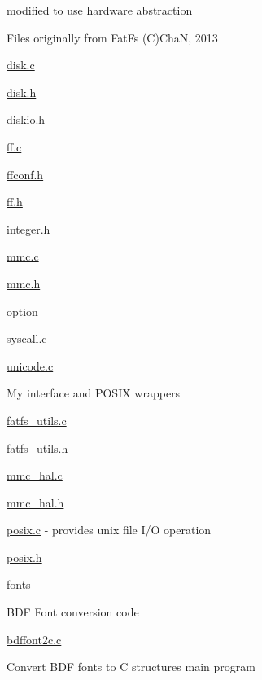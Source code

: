 \begin{DoxyItemize}
\begin{DoxyItemize}
\begin{DoxyItemize}
\item modified to use hardware abstraction
\end{DoxyItemize}
\item Files originally from Fat\+Fs (C)ChaN, 2013
\begin{DoxyItemize}
\item \hyperlink{disk_8c}{disk.\+c}
\item \hyperlink{disk_8h}{disk.\+h}
\item \hyperlink{diskio_8h}{diskio.\+h}
\item \hyperlink{ff_8c}{ff.\+c}
\item \hyperlink{ffconf_8h}{ffconf.\+h}
\item \hyperlink{ff_8h}{ff.\+h}
\item \hyperlink{integer_8h}{integer.\+h}
\item \hyperlink{mmc_8c}{mmc.\+c}
\item \hyperlink{mmc_8h}{mmc.\+h}
\item option
\item \hyperlink{syscall_8c}{syscall.\+c}
\item \hyperlink{unicode_8c}{unicode.\+c}
\end{DoxyItemize}
\item My interface and P\+O\+S\+IX wrappers
\begin{DoxyItemize}
\item \hyperlink{fatfs__utils_8c}{fatfs\+\_\+utils.\+c}
\item \hyperlink{fatfs__utils_8h}{fatfs\+\_\+utils.\+h}
\item \hyperlink{mmc__hal_8c}{mmc\+\_\+hal.\+c}
\item \hyperlink{mmc__hal_8h}{mmc\+\_\+hal.\+h}
\item \hyperlink{posix_8c}{posix.\+c} -\/ provides unix file I/O operation
\item \hyperlink{posix_8h}{posix.\+h}
\end{DoxyItemize}
\end{DoxyItemize}
\item fonts
\begin{DoxyItemize}
\item B\+DF Font conversion code
\begin{DoxyItemize}
\item \hyperlink{bdffont2c_8c}{bdffont2c.\+c}
\begin{DoxyItemize}
\item Convert B\+DF fonts to C structures main program

\end{DoxyItemize}
\end{DoxyItemize}
\end{DoxyItemize}
\end{DoxyItemize}
